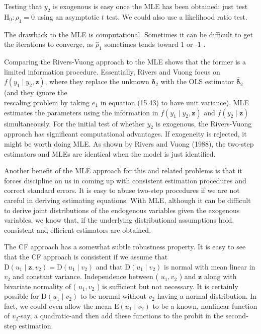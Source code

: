 \documentclass[10pt]{article}
\begin{document}
Testing that $y_{2}$ is exogenous is easy once the MLE has been obtained: just test $\mathrm{H}_{0}: \rho_{1}=0$ using an asymptotic $t$ test. We could also use a likelihood ratio test.

The drawback to the MLE is computational. Sometimes it can be difficult to get the iterations to converge, as $\hat{\rho}_{1}$ sometimes tends toward 1 or -1 .

Comparing the Rivers-Vuong approach to the MLE shows that the former is a limited information procedure. Essentially, Rivers and Vuong focus on $f\left(y_{1} \mid y_{2}, \mathbf{z}\right)$, where they replace the unknown $\boldsymbol{\delta}_{2}$ with the OLS estimator $\hat{\boldsymbol{\delta}}_{2}$ (and they ignore the\\
rescaling problem by taking $e_{1}$ in equation (15.43) to have unit variance). MLE estimates the parameters using the information in $f\left(y_{1} \mid y_{2}, \mathbf{z}\right)$ and $f\left(y_{2} \mid \mathbf{z}\right)$ simultaneously. For the initial test of whether $y_{2}$ is exogenous, the Rivers-Vuong approach has significant computational advantages. If exogeneity is rejected, it might be worth doing MLE. As shown by Rivers and Vuong (1988), the two-step estimators and MLEs are identical when the model is just identified.

Another benefit of the MLE approach for this and related problems is that it forces discipline on us in coming up with consistent estimation procedures and correct standard errors. It is easy to abuse two-step procedures if we are not careful in deriving estimating equations. With MLE, although it can be difficult to derive joint distributions of the endogenous variables given the exogenous variables, we know that, if the underlying distributional assumptions hold, consistent and efficient estimators are obtained.

The CF approach has a somewhat subtle robustness property. It is easy to see that the CF approach is consistent if we assume that $\mathrm{D}\left(u_{1} \mid \mathbf{z}, v_{2}\right)=\mathrm{D}\left(u_{1} \mid v_{2}\right)$ and that $\mathrm{D}\left(u_{1} \mid v_{2}\right)$ is normal with mean linear in $v_{2}$ and constant variance. Independence between ( $u_{1}, v_{2}$ ) and $\mathbf{z}$ along with bivariate normality of ( $u_{1}, v_{2}$ ) is sufficient but not necessary. It is certainly possible for $\mathrm{D}\left(u_{1} \mid v_{2}\right)$ to be normal without $v_{2}$ having a normal distribution. In fact, we could even allow the mean $\mathrm{E}\left(u_{1} \mid v_{2}\right)$ to be a known, nonlinear function of $v_{2}$-say, a quadratic-and then add these functions to the probit in the second-step estimation.
\end{document}
